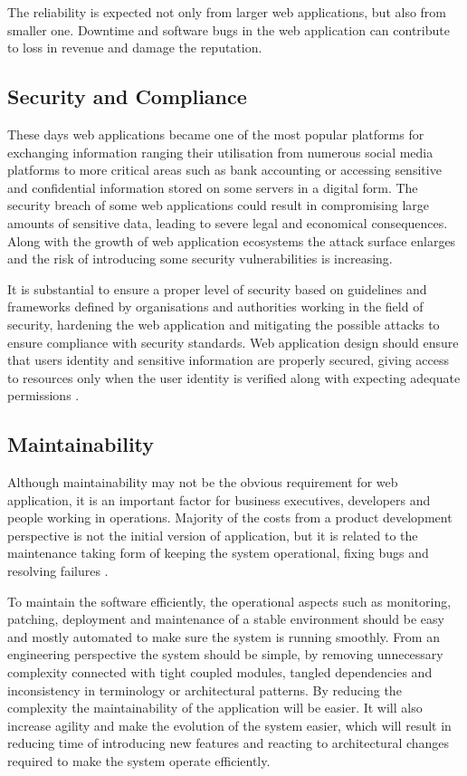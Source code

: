 The reliability is expected not only from larger web applications, but also from smaller one. Downtime and software bugs in the web application can contribute to loss in revenue and damage the reputation.

\subsection*{Security and Compliance}

These days web applications became one of the most popular platforms for exchanging information ranging their utilisation from numerous social media platforms to more critical areas such as bank accounting or accessing sensitive and confidential information stored on some servers in a digital form. The security breach of some web applications could result in compromising large amounts of sensitive data, leading to severe legal and economical consequences. Along with the growth of web application ecosystems the attack surface enlarges and the risk of introducing some security vulnerabilities is increasing.

It is substantial to ensure a proper level of security based on guidelines and frameworks defined by organisations and authorities working in the field of security, hardening the web application and mitigating the possible attacks to ensure compliance with security standards. Web application design should ensure that users identity and sensitive information are properly secured, giving access to resources only when the user identity is verified along with expecting adequate permissions \cite{ASurveyonWebApplicationSecurity}.

\subsection*{Maintainability}

Although maintainability may not be the obvious requirement for web application, it is an important factor for business executives, developers and people working in operations. Majority of the costs from a product development perspective is not the initial version of application, but it is related to the maintenance taking form of keeping the system operational, fixing bugs and resolving failures \cite{DesignDataIntensiveApplications}.

To maintain the software efficiently, the operational aspects such as monitoring, patching, deployment and maintenance of a stable environment should be easy and mostly automated to make sure the system is running smoothly. From an engineering perspective the system should be simple, by removing unnecessary complexity connected with tight coupled modules, tangled dependencies and inconsistency in terminology or architectural patterns. By reducing the complexity the maintainability of the application will be easier. It will also increase agility and make the evolution of the system easier, which will result in reducing time of introducing new features and reacting to architectural changes required to make the system operate efficiently.

